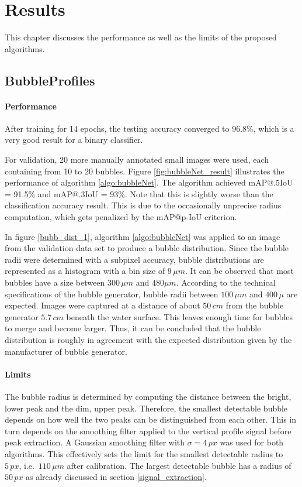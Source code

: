 \chapter{Results}\label{results}
	This chapter discusses the performance as well as the limits of the proposed algorithms. 
	
		\section{BubbleProfiles}\label{result_profiles}
			
			\subsubsection{Performance}
			After training for 14 epochs, the testing accuracy converged to 96.8\%, which is a very good result for a binary classifier. 

			For validation, 20 more manually annotated small images were used, each containing from 10 to 20 bubbles. Figure \ref{fig:bubbleNet_result} illustrates the performance of algorithm \ref{algo:bubbleNet}.  
			The algorithm achieved mAP@.5IoU = 91.5\% and mAP@.3IoU = 93\%. Note that this is slightly worse than the classification accuracy result. This is due to the occasionally unprecise radius computation, which gets penalized by the mAP@p-IoU criterion. 
			
			In figure \ref{bubb_dist_1}, algorithm \ref{algo:bubbleNet} was applied to an image from the validation data set to produce a bubble distribution. Since the bubble radii were determined with a subpixel accuracy, bubble distributions are represented as a histogram with a bin size of $9 \, \mu m$. It can be observed that most bubbles have a size between $300 \, \mu m$ and $480 \mu m$. According to the technical specifications of the bubble generator, bubble radii between $100 \, \mu m$ and $400 \, \mu$ are expected. Images were captured at a distance of about $50 \, cm$ from the bubble generator $5.7 \, cm$ beneath the water surface. This leaves enough time for bubbles to merge and become larger. Thus, it can be concluded that the bubble distribution is roughly in agreement with the expected distribution given by the manufacturer of bubble generator.
			
			\subsubsection{Limits}
			The bubble radius is determined by computing the distance between the bright, lower peak and the dim, upper peak. Therefore, the smallest detectable bubble depends on how well the two peaks can be distinguished from each other.
			 This in turn depends on the smoothing filter applied to the vertical profile signal before peak extraction. A Gaussian smoothing filter with $\sigma = 4 \, px$ was used for both algorithms. This effectively sets the limit for the smallest detectable radius to $5 \, px$, i.e.\ $110 \, \mu m$ after calibration. The largest detectable bubble has a radius of $50 \, px$ as already discussed in section \ref{signal_extraction}. 
			 
